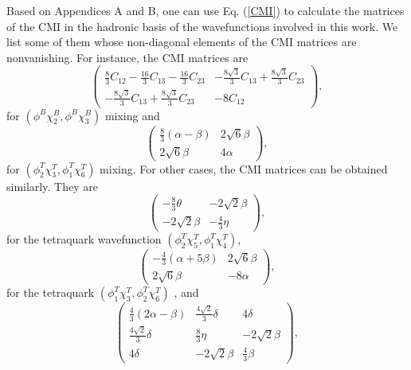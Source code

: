 \documentclass[prd,twocolumn,floatfix,nofootinbib]{revtex4}
\begin{document}
\label{AppendixC} \setcounter{equation}{0} \renewcommand{\theequation}{C%
\arabic{equation}} Based on Appendices A and B, one can use Eq. (\ref{CMI})
to calculate the matrices of the CMI in the hadronic basis of the
wavefunctions involved in this work. We list some of them whose non-diagonal
elements of the CMI matrices are nonvanishing. For instance, the CMI
matrices are
\begin{equation}
\begin{pmatrix}
\frac{8}{3}C_{12}-\frac{16}{3}C_{13}-\frac{16}{3}C_{23} & -\frac{8\sqrt{3}}{3%
}C_{13}+\frac{8\sqrt{3}}{3}C_{23} \\
-\frac{8\sqrt{3}}{3}C_{13}+\frac{8\sqrt{3}}{3}C_{23} & -8C_{12}%
\end{pmatrix}%
,  \label{mixing23}
\end{equation}%
for $(\phi ^{B}\chi _{2}^{B},\phi ^{B}\chi _{3}^{B})$ mixing and
\begin{equation}
\begin{pmatrix}
\frac{8}{3}(\alpha -\beta ) & 2\sqrt{6}\beta  \\
2\sqrt{6}\beta  & 4\alpha
\end{pmatrix}%
,  \label{21mixing36}
\end{equation}%
for $(\phi _{2}^{T}\chi _{3}^{T},\phi _{1}^{T}\chi _{6}^{T})$ mixing. For
other cases, the CMI matrices can be obtained similarly. They are
\begin{equation}
\begin{pmatrix}
-\frac{8}{3}\theta  & -2\sqrt{2}\beta  \\
-2\sqrt{2}\beta  & -\frac{4}{3}\eta
\end{pmatrix}%
,  \label{21mixing54}
\end{equation}%
for the tetraquark wavefunction $(\phi _{2}^{T}\chi _{5}^{T},\phi
_{1}^{T}\chi _{4}^{T})$,
\begin{equation}
\begin{pmatrix}
-\frac{4}{3}(\alpha +5\beta ) & 2\sqrt{6}\beta  \\
2\sqrt{6}\beta  & -8\alpha
\end{pmatrix}%
,  \label{12mixing36}
\end{equation}%
for the tetraquark $(\phi _{1}^{T}\chi _{3}^{T},\phi _{2}^{T}\chi _{6}^{T})$%
, and
\begin{equation}
\begin{pmatrix}
\frac{4}{3}(2\alpha -\beta ) & \frac{4\sqrt{2}}{3}\delta  & 4\delta  \\
\frac{4\sqrt{2}}{3}\delta  & \frac{8}{3}\eta  & -2\sqrt{2}\beta  \\
4\delta  & -2\sqrt{2}\beta  & \frac{4}{3}\beta
\end{pmatrix}%
,  \label{221mixing245}
\end{equation}%
\end{document}
